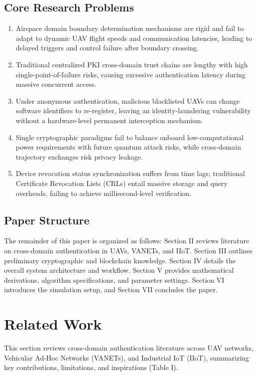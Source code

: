 \documentclass[lettersize,journal]{IEEEtran}
\begin{document}
\subsection{Core Research Problems}
\begin{enumerate}
    \item Airspace domain boundary determination mechanisms are rigid and fail to adapt to dynamic UAV flight speeds and communication latencies, leading to delayed triggers and control failure after boundary crossing.
    \item Traditional centralized PKI cross-domain trust chains are lengthy with high single-point-of-failure risks, causing excessive authentication latency during massive concurrent access.
    \item Under anonymous authentication, malicious blacklisted UAVs can change software identifiers to re-register, leaving an identity-laundering vulnerability without a hardware-level permanent interception mechanism.
    \item Single cryptographic paradigms fail to balance onboard low-computational power requirements with future quantum attack risks, while cross-domain trajectory exchanges risk privacy leakage.
    \item Device revocation status synchronization suffers from time lags; traditional Certificate Revocation Lists (CRLs) entail massive storage and query overheads, failing to achieve millisecond-level verification.
\end{enumerate}

\subsection{Paper Structure}
The remainder of this paper is organized as follows: Section II reviews literature on cross-domain authentication in UAVs, VANETs, and IIoT. Section III outlines preliminary cryptographic and blockchain knowledge. Section IV details the overall system architecture and workflow. Section V provides mathematical derivations, algorithm specifications, and parameter settings. Section VI introduces the simulation setup, and Section VII concludes the paper.

\section{Related Work}
This section reviews cross-domain authentication literature across UAV networks, Vehicular Ad-Hoc Networks (VANETs), and Industrial IoT (IIoT), summarizing key contributions, limitations, and inspirations (Table I).
\end{document}
